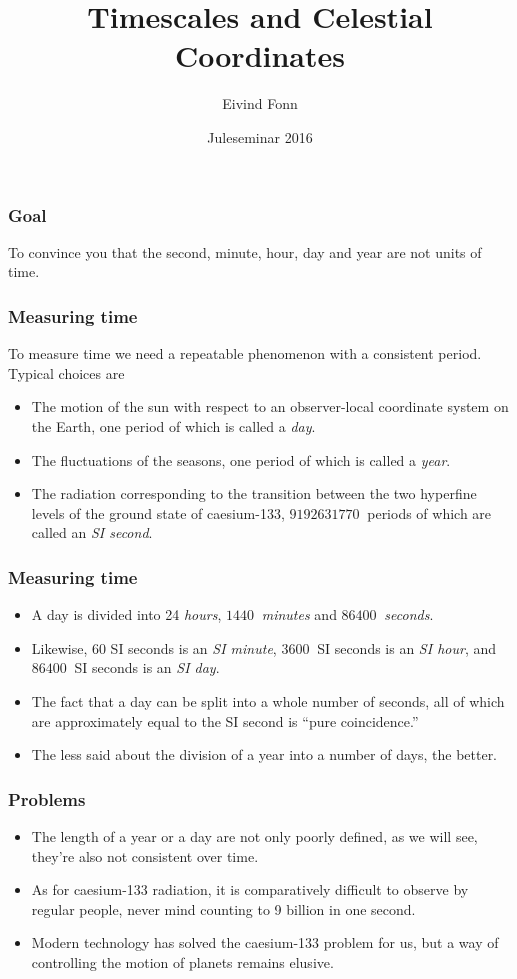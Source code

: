 \documentclass{beamer}
\title{Timescales and Celestial Coordinates}
\author{Eivind Fonn}
\date{Juleseminar 2016}
\begin{document}
\frame{\titlepage}

\begin{frame}
  \frametitle{Goal}

  \begin{center}
    To convince you that the second, minute, hour, day and year are not units of
    time.
  \end{center}
\end{frame}

\begin{frame}
  \frametitle{Measuring time}

  To measure time we need a repeatable phenomenon with a consistent period.
  Typical choices are

  \begin{itemize}
  \item The motion of the sun with respect to an observer-local coordinate
    system on the Earth, one period of which is called a \emph{day}.
  \item The fluctuations of the seasons, one period of which is called a
    \emph{year}.
  \item The radiation corresponding to the transition between the two hyperfine
    levels of the ground state of caesium-133, $\SI{9192631770}{}$ periods of
    which are called an \emph{SI second}.
  \end{itemize}
\end{frame}

\begin{frame}
  \frametitle{Measuring time}

  \begin{itemize}
  \item A day is divided into 24 \emph{hours}, $\SI{1440}{}$ \emph{minutes} and
    $\SI{86400}{}$ \emph{seconds}.
  \item Likewise, 60 SI seconds is an \emph{SI minute}, $\SI{3600}{}$ SI seconds
    is an \emph{SI hour}, and $\SI{86400}{}$ SI seconds is an \emph{SI day}.
  \item The fact that a day can be split into a whole number of seconds, all of
    which are approximately equal to the SI second is ``pure coincidence.''
  \item The less said about the division of a year into a number of days, the
    better.
  \end{itemize}
\end{frame}

\begin{frame}
  \frametitle{Problems}

  \begin{itemize}
  \item The length of a year or a day are not only poorly defined, as we will
    see, they're also not consistent over time.
  \item As for caesium-133 radiation, it is comparatively difficult to observe
    by regular people, never mind counting to 9 billion in one second.
  \item Modern technology has solved the caesium-133 problem for us, but
    a way of controlling the motion of planets remains elusive.
  \end{itemize}
\end{frame}
\end{document}
